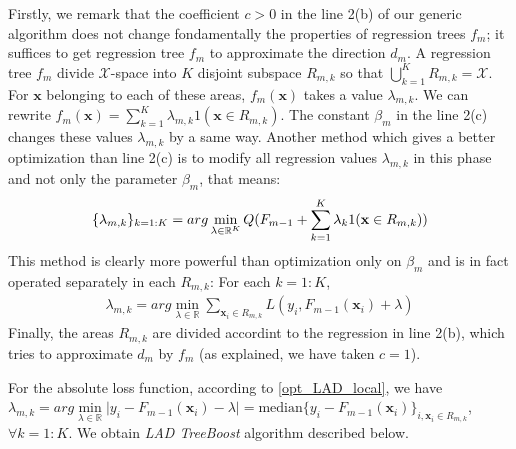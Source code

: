 \documentclass[a4paper,twoside,12pt]{article}
\begin{document}
Firstly, we remark that the coefficient $c > 0$ in the line 2(b) of our generic algorithm does not change fondamentally the properties of regression trees $f_m$; it suffices to get regression tree $f_m$ to approximate the direction $d_m$. A regression tree $f_m$ divide $\mathcal{X}$-space into $K$ disjoint subspace $R_{m,k}$ so that $\bigcup\limits_{k=1}^K R_{m,k} = \mathcal{X}$. For $\textbf{x}$ belonging to each of these areas, $f_m(\textbf{x})$ takes a value $\lambda_{m,k}$. We can rewrite $f_m(\textbf{x}) = \sum\limits_{k=1}^K \lambda_{m,k} 1(\textbf{x}\in R_{m,k})$. The constant $\beta_m$ in the line 2(c) changes these values $\lambda_{m,k}$ by a same way. Another method which gives a better optimization than line 2(c) is to modify all regression values $\lambda_{m,k}$ in this phase and not only the parameter $\beta_m$, that means:
\begin{align}
    \{ \lambda_{m,k}\}_{k=1:K} = arg\min\limits_{\lambda \in \mathbb{R}^K} Q(F_{m-1} + \sum\limits_{k=1}^K \lambda_k 1(\textbf{x} \in R_{m,k})) \notag
\end{align}
This method is clearly more powerful than optimization only on $\beta_m$ and is in fact operated separately in each $R_{m,k}$: For each $k=1:K$,
\begin{align}
    \lambda_{m,k} = arg\min\limits_{\lambda \in \mathbb{R}} \sum\limits_{\textbf{x}_i \in R_{m,k}} L(y_i, F_{m-1}(\textbf{x}_i) + \lambda) \label{opt_LAD_local}
\end{align}
Finally, the areas $R_{m,k}$ are divided accordint to the regression in line 2(b), which tries to approximate $d_m$ by $f_m$ (as explained, we have taken $c = 1$).

For the absolute loss function, according to \eqref{opt_LAD_local}, we have $\lambda_{m,k} = arg\min\limits_{\lambda \in \mathbb{R}} \vert y_i - F_{m-1}(\textbf{x}_i) - \lambda\vert = \text{median} \{y_i - F_{m-1}(\textbf{x}_i)\}_{i, \textbf{x}_i \in R_{m,k}}$, $\forall k=1:K$. We obtain \textsl{LAD TreeBoost} algorithm described below.

\begin{center}
\end{center}
\end{document}
